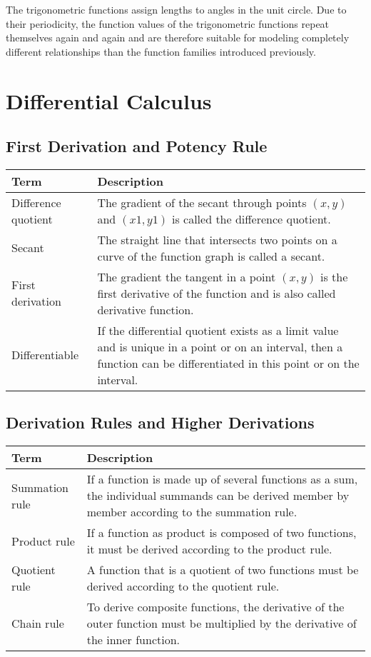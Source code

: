 \documentclass{book}
\begin{document}
The trigonometric functions assign lengths to angles in the unit circle. Due to their periodicity, the function values of the trigonometric functions repeat themselves again and again and are therefore suitable for modeling completely different relationships than the function families introduced previously.


\chapter{Differential Calculus}

\section{First Derivation and Potency Rule}

\begin{tabular}{p{3cm}p{10.5cm}}
  \toprule
  \textbf{Term} & \textbf{Description} \\
  \midrule
  Difference quotient & The gradient of the secant through points $(x, y)$ and $(x1, y1)$ is called the difference quotient.\\
  \midrule
  Secant & The straight line that intersects two points on a curve of the function graph is called a secant.\\
  \midrule
  First derivation & The gradient the tangent in a point $(x, y)$ is the first derivative of the function and is also called derivative function.\\
  \midrule
  Differentiable & If the differential quotient exists as a limit value and is unique in a point or on an interval, then a function can be differentiated in this point or on the interval.\\
  \bottomrule
\end{tabular}


\section{Derivation Rules and Higher Derivations}

\begin{tabular}{p{3cm}p{10.5cm}}
  \toprule
  \textbf{Term} & \textbf{Description} \\
  \midrule
  Summation rule & If a function is made up of several functions as a sum, the individual summands can be derived member by member according to the summation rule.\\
  \midrule
  Product rule & If a function as product is composed of two functions, it must be derived according to the product rule.\\
  \midrule
  Quotient rule & A function that is a quotient of two functions must be derived according to the quotient rule.\\
  \midrule
  Chain rule & To derive composite functions, the derivative of the outer function must be multiplied by the derivative of the inner function.\\
  \bottomrule
\end{tabular}
\end{document}
